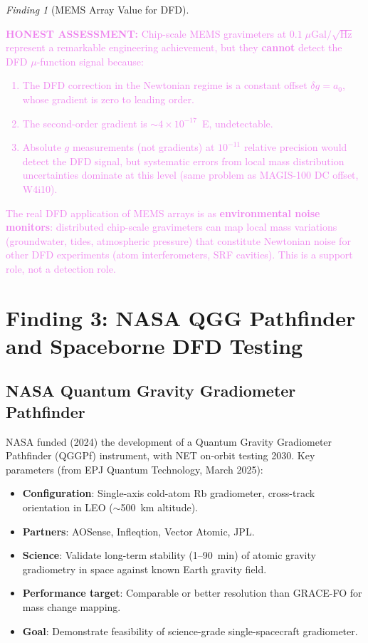 \documentclass[11pt]{article}
\theoremstyle{definition}
\theoremstyle{remark}
\newtheorem{finding}[theorem]{Finding}
\newcommand{\ee}[1]{\times10^{#1}}
\newcommand{\azero}{a_0}
\newcommand{\honest}[1]{\textcolor{violet}{\textbf{HONEST ASSESSMENT:} #1}}
\begin{document}
\begin{finding}[MEMS Array Value for DFD]
\label{find:mems-value}
\honest{Chip-scale MEMS gravimeters at $0.1\;\mu\mathrm{Gal}/\sqrt{\mathrm{Hz}}$
represent a remarkable engineering achievement, but they \textbf{cannot}
detect the DFD $\mu$-function signal because:

\begin{enumerate}[nosep]
\item The DFD correction in the Newtonian regime is a constant offset
  $\delta g = \azero$, whose gradient is zero to leading order.
\item The second-order gradient is $\sim 4\ee{-17}$~E, undetectable.
\item Absolute $g$ measurements (not gradients) at $10^{-11}$ relative
  precision would detect the DFD signal, but systematic errors from
  local mass distribution uncertainties dominate at this level
  (same problem as MAGIS-100 DC offset, W4i10).
\end{enumerate}

The real DFD application of MEMS arrays is as \textbf{environmental
noise monitors}: distributed chip-scale gravimeters can map local mass
variations (groundwater, tides, atmospheric pressure) that constitute
Newtonian noise for other DFD experiments (atom interferometers, SRF
cavities). This is a support role, not a detection role.}
\end{finding}

\section{Finding 3: NASA QGG Pathfinder and Spaceborne DFD Testing}
\label{sec:qgg}

\subsection{NASA Quantum Gravity Gradiometer Pathfinder}

NASA funded (2024) the development of a Quantum Gravity Gradiometer
Pathfinder (QGGPf) instrument, with NET on-orbit testing 2030.
Key parameters (from EPJ Quantum Technology, March 2025):

\begin{itemize}[nosep]
\item \textbf{Configuration}: Single-axis cold-atom Rb gradiometer,
  cross-track orientation in LEO ($\sim$500~km altitude).
\item \textbf{Partners}: AOSense, Infleqtion, Vector Atomic, JPL.
\item \textbf{Science}: Validate long-term stability (1--90~min) of
  atomic gravity gradiometry in space against known Earth gravity field.
\item \textbf{Performance target}: Comparable or better resolution than
  GRACE-FO for mass change mapping.
\item \textbf{Goal}: Demonstrate feasibility of science-grade
  single-spacecraft gradiometer.
\end{itemize}
\end{document}
